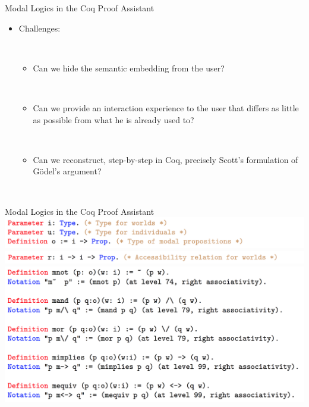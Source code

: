 \begin{frame}{Modal Logics in the Coq Proof Assistant}
\begin{itemize}
\item \begin{LARGE} Challenges: \end{LARGE} \\[0.7em]
\begin{itemize}
\item \begin{large} Can we hide the semantic embedding from the user? \end{large}\\[0.5em]
\pause
\item \begin{large} Can we provide an interaction experience to the user that differs as little as possible from what he is already used to? \end{large}\\[0.5em]
\pause
\item \begin{large} Can we reconstruct, step-by-step in Coq, precisely Scott's formulation of G\"odel's argument?  \end{large}\\[0.5em]
\end{itemize}
\end{itemize}
\end{frame}


\begin{frame}{Modal Logics in the Coq Proof Assistant}
\includegraphics[width=\textwidth]{Images/CoqCode/1.png}\\
\includegraphics[width=\textwidth]{Images/CoqCode/2.png}\\
\includegraphics[width=\textwidth]{Images/CoqCode/3.png}
\end{frame}

